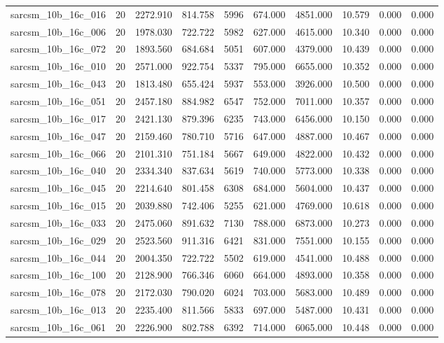 \begin{tabular}{lrrrrrrrrr}
sarcsm\_10b\_16c\_016 & 20 & 2272.910 & 814.758 & 5996 & 674.000 & 4851.000 & 10.579 & 0.000 & 0.000 \\
sarcsm\_10b\_16c\_006 & 20 & 1978.030 & 722.722 & 5982 & 627.000 & 4615.000 & 10.340 & 0.000 & 0.000 \\
sarcsm\_10b\_16c\_072 & 20 & 1893.560 & 684.684 & 5051 & 607.000 & 4379.000 & 10.439 & 0.000 & 0.000 \\
sarcsm\_10b\_16c\_010 & 20 & 2571.000 & 922.754 & 5337 & 795.000 & 6655.000 & 10.352 & 0.000 & 0.000 \\
sarcsm\_10b\_16c\_043 & 20 & 1813.480 & 655.424 & 5937 & 553.000 & 3926.000 & 10.500 & 0.000 & 0.000 \\
sarcsm\_10b\_16c\_051 & 20 & 2457.180 & 884.982 & 6547 & 752.000 & 7011.000 & 10.357 & 0.000 & 0.000 \\
sarcsm\_10b\_16c\_017 & 20 & 2421.130 & 879.396 & 6235 & 743.000 & 6456.000 & 10.150 & 0.000 & 0.000 \\
sarcsm\_10b\_16c\_047 & 20 & 2159.460 & 780.710 & 5716 & 647.000 & 4887.000 & 10.467 & 0.000 & 0.000 \\
sarcsm\_10b\_16c\_066 & 20 & 2101.310 & 751.184 & 5667 & 649.000 & 4822.000 & 10.432 & 0.000 & 0.000 \\
sarcsm\_10b\_16c\_040 & 20 & 2334.340 & 837.634 & 5619 & 740.000 & 5773.000 & 10.338 & 0.000 & 0.000 \\
sarcsm\_10b\_16c\_045 & 20 & 2214.640 & 801.458 & 6308 & 684.000 & 5604.000 & 10.437 & 0.000 & 0.000 \\
sarcsm\_10b\_16c\_015 & 20 & 2039.880 & 742.406 & 5255 & 621.000 & 4769.000 & 10.618 & 0.000 & 0.000 \\
sarcsm\_10b\_16c\_033 & 20 & 2475.060 & 891.632 & 7130 & 788.000 & 6873.000 & 10.273 & 0.000 & 0.000 \\
sarcsm\_10b\_16c\_029 & 20 & 2523.560 & 911.316 & 6421 & 831.000 & 7551.000 & 10.155 & 0.000 & 0.000 \\
sarcsm\_10b\_16c\_044 & 20 & 2004.350 & 722.722 & 5502 & 619.000 & 4541.000 & 10.488 & 0.000 & 0.000 \\
sarcsm\_10b\_16c\_100 & 20 & 2128.900 & 766.346 & 6060 & 664.000 & 4893.000 & 10.358 & 0.000 & 0.000 \\
sarcsm\_10b\_16c\_078 & 20 & 2172.030 & 790.020 & 6024 & 703.000 & 5683.000 & 10.489 & 0.000 & 0.000 \\
sarcsm\_10b\_16c\_013 & 20 & 2235.400 & 811.566 & 5833 & 697.000 & 5487.000 & 10.431 & 0.000 & 0.000 \\
sarcsm\_10b\_16c\_061 & 20 & 2226.900 & 802.788 & 6392 & 714.000 & 6065.000 & 10.448 & 0.000 & 0.000 \\

\end{tabular}

